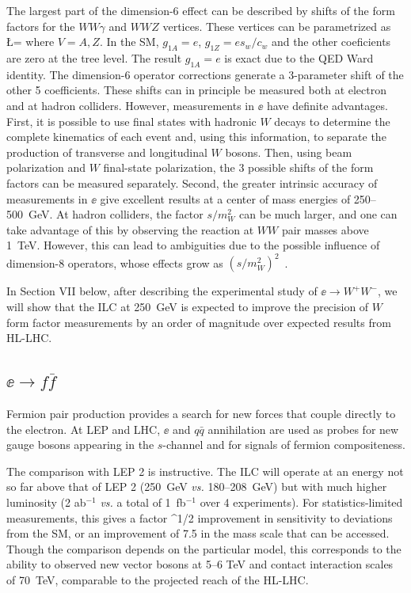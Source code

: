 The largest part of the dimension-6 effect can be described by shifts of the form 
factors for the $WW\gamma$ and $WWZ$ vertices.  These vertices can be parametrized as \cite{Hagiwara:1986vm}
\beq
\Delta \L = 
where $V = A,Z$.  In the SM, $g_{1A} = e$, $g_{1Z} = e s_w/c_w$ and the other coeficients are zero at the tree level.   The result $g_{1A} = e$ is exact due to the QED Ward identity.  The dimension-6 operator corrections generate a 3-parameter shift of the other 5 coefficients. These shifts can in principle be measured both at electron and at hadron colliders.  However, measurements in $\ee$ have  definite advantages.   First, it is possible to use final states with hadronic $W$ decays to determine the complete kinematics of each event and, using this information, to separate the production of 
transverse and longitudinal $W$ bosons.   Then, using beam polarization and $W$ final-state polarization, the 3 possible shifts of the form factors can be measured separately.   Second,  the greater intrinsic accuracy of measurements in $\ee$ give excellent results at a center of mass energies of 250--500~GeV.  At hadron colliders, 
the factor $s/m_W^2$ can be much larger, and one can take advantage of this by observing the reaction at $WW$ pair masses above 1~TeV.  However, this can lead to ambiguities due to the possible influence of dimension-8 operators, whose effects grow as $(s/m_W^2)^2$~\cite{Falkowski:2016cxu}. 

In Section VII  below, after describing the experimental study of $\ee\to W^+W^-$, we will show that the ILC at 250~GeV is expected to improve the precision of $W$ form factor measurements by an order of magnitude over expected results from HL-LHC.




\subsection{$\ee\to f\bar f$}

Fermion pair production provides a search for new forces that couple directly to the electron.   At LEP and LHC, $\ee$ and $q\bar q$ annihilation are used as probes for new gauge bosons appearing in the $s$-channel and for signals of fermion compositeness. 

The comparison with LEP 2 is instructive.   The ILC will operate at an energy not so far above that of LEP 2  (250~GeV {\it vs.}  180--208~GeV)  but with much higher luminosity (2 ab$^{-1}$  {\it vs.} a total of 1~fb$^{-1}$ over 4 experiments).   For statistics-limited measurements, this gives a factor 
\beq
   ^{1/2}  
\eeqn
improvement in sensitivity to deviations from the SM, or an improvement of  7.5 in the mass scale that can be accessed.   Though the comparison depends on the particular model, this corresponds to the ability to observed new vector bosons at 5--6 TeV and 
contact interaction scales of 70~TeV, comparable to  the projected reach of the HL-LHC. 

